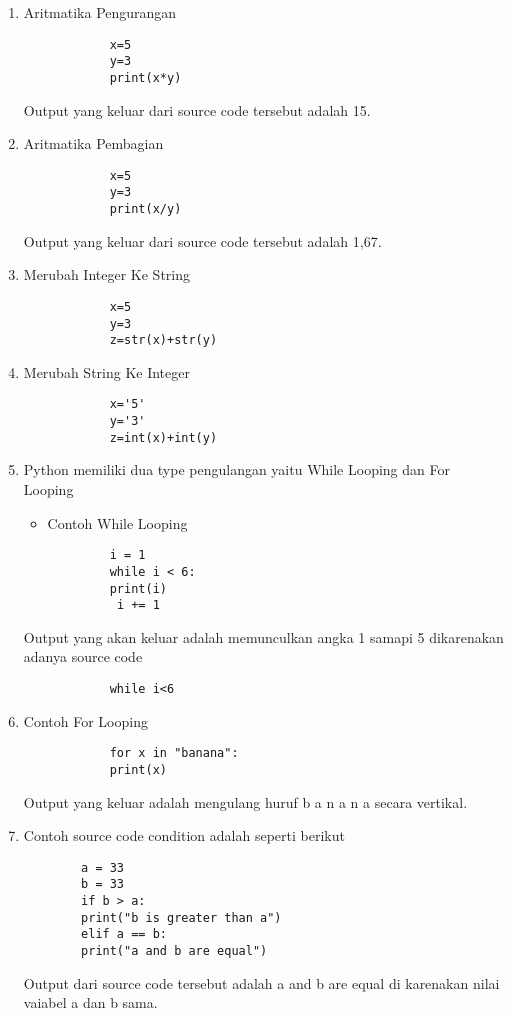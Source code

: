 \begin{enumerate}
	\item Aritmatika Pengurangan
		\begin{verbatim}
			x=5
			y=3
			print(x*y)
		\end{verbatim}
	\subitem Output yang keluar dari source code tersebut adalah 15.

	\item Aritmatika Pembagian
		\begin{verbatim}
			x=5
			y=3
			print(x/y)
		\end{verbatim}
	\subitem Output yang keluar dari source code tersebut adalah 1,67.

	\item Merubah Integer Ke String
		\begin{verbatim}
			x=5
			y=3
			z=str(x)+str(y)
		\end{verbatim}

	\item Merubah String Ke Integer
		\begin{verbatim}
			x='5'
			y='3'
			z=int(x)+int(y)
		\end{verbatim}
\par
\item Python memiliki dua type pengulangan yaitu While Looping dan For Looping

\begin{itemize}
	\item Contoh While Looping
\end{itemize}
		\begin{verbatim}
			i = 1
			while i < 6:
		  	print(i)
 			 i += 1
		\end{verbatim}
	\subitem Output yang akan keluar adalah memunculkan angka 1 samapi 5 dikarenakan adanya source code
		\begin{verbatim}
			while i<6
		\end{verbatim}
	
	\item Contoh For Looping
		\begin{verbatim}
			for x in "banana":
			print(x)
		\end{verbatim}
	\subitem Output yang keluar adalah mengulang huruf b a n a n a secara vertikal.
\par
\item Contoh source code condition adalah seperti berikut
	\begin{verbatim}
		a = 33
		b = 33
		if b > a:
  		print("b is greater than a")
		elif a == b:
  		print("a and b are equal")
	\end{verbatim}
\subitem Output dari source code tersebut adalah a and b are equal di karenakan nilai vaiabel a dan b sama.


\end{enumerate}
